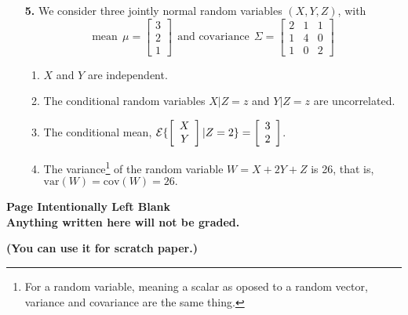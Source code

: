 \documentclass[letterpaper]{article}
\newcommand{\ExpectofGiven}[2]{{\cal E} \{ #1 | #2 \}}
\begin{document}
\begin{enumerate}
\item[{\bf 5.}] We consider three jointly normal random variables $(X,Y,Z)$, with
$$ \mbox{mean}~~\mu = \left[\begin{array}{r} 3\\  2\\  1\end{array} \right] ~~\mbox{and covariance}~~ \Sigma = \left[  \begin{array}{rrr}  2&   1&   1\\  1&   4&   0\\  1&   0&   2\end{array}
\right] $$
\begin{enumerate}
\setlength{\itemsep}{.15in}
\renewcommand{\labelenumi}{(\alph{enumi})}
\setlength{\itemsep}{.1in}
\item $X$ and $Y$ are independent.
\item The conditional random variables $X{\Big|Z=z}$ and $Y{\Big|Z=z}$ are uncorrelated.
\item The conditional mean, $\ExpectofGiven{\left[ \begin{array}{r} X \\  Y \end{array} \right]}{Z=2} = \left[ \begin{array}{r} 3\\  2 \end{array} \right]$.
\item The variance\footnote{For a random variable, meaning a scalar as oposed to a random vector, variance and covariance are the same thing.} of the random variable $W=X + 2 Y + Z$ is 26, that is, $\mathrm{var}(W) = \mathrm{cov}(W)=26.$
\end{enumerate}



\end{enumerate}

\newpage

\begin{center}
\vspace*{6cm}

{\bf \LARGE Page Intentionally Left Blank}\\

\vspace*{3cm}
\textbf{Anything written here will not be graded.}

\textbf{(You can use it for scratch paper.)}

\end{center}
\end{document}
